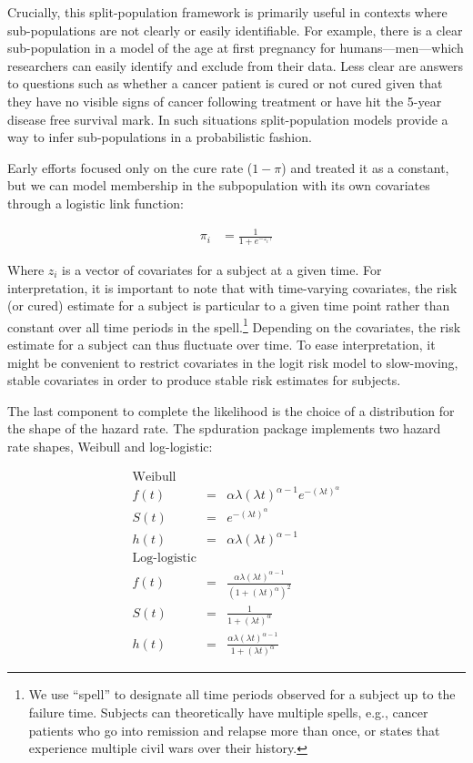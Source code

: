 \documentclass[12pt,onesided]{amsart}
\newcommand{\pkg}[1]{{\fontseries{b}\selectfont #1}}
\begin{document}
Crucially, this split-population framework is primarily useful in
contexts where sub-populations are not clearly or easily identifiable.
For example, there is a clear sub-population in a model of the age at
first pregnancy for humans---men---which researchers can easily identify
and exclude from their data. Less clear are answers to questions such as
whether a cancer patient is cured or not cured given that they have no
visible signs of cancer following treatment or have hit the 5-year
disease free survival mark. In such situations split-population models
provide a way to infer sub-populations in a probabilistic fashion.

Early efforts focused only on the cure rate (\(1 - \pi\)) and treated it
as a constant, but we can model membership in the subpopulation with its
own covariates through a logistic link function:

\begin{align}
\pi_i &= \frac{1}{1 + e^{-z_i \gamma}}
\end{align}

Where \(z_i\) is a vector of covariates for a subject at a given time.
For interpretation, it is important to note that with time-varying
covariates, the risk (or cured) estimate for a subject is particular to
a given time point rather than constant over all time periods in the
spell.\footnote{We use ``spell'' to designate all time periods observed for a subject up to the failure time. Subjects can theoretically have multiple spells, e.g., cancer patients who go into remission and relapse more than once, or states that experience multiple civil wars over their history.}
Depending on the covariates, the risk estimate for a subject can thus
fluctuate over time. To ease interpretation, it might be convenient to
restrict covariates in the logit risk model to slow-moving, stable
covariates in order to produce stable risk estimates for subjects.

The last component to complete the likelihood is the choice of a
distribution for the shape of the hazard rate. The \pkg{spduration}
package implements two hazard rate shapes, Weibull and log-logistic:

\begin{eqnarray*}
\textrm{Weibull} \\
 f(t) & = & \alpha \lambda (\lambda t)^{\alpha - 1} e^{-(\lambda t)^\alpha} \\
  S(t) & = & e^{ -(\lambda t )^\alpha } \\
 h(t) & = & \alpha \lambda (\lambda t)^{\alpha-1} \\
\textrm{Log-logistic} \\
 f(t) & = & \frac{ \alpha \lambda (\lambda t)^{\alpha-1} }{ (1 + (\lambda t)^\alpha)^2 } \\
 S(t) & = & \frac{1}{ 1+  (\lambda t)^\alpha }  \\
 h(t) & = & \frac{ \alpha \lambda (\lambda t)^{\alpha-1} }{ 1+  (\lambda t)^\alpha }
\end{eqnarray*}
\end{document}
